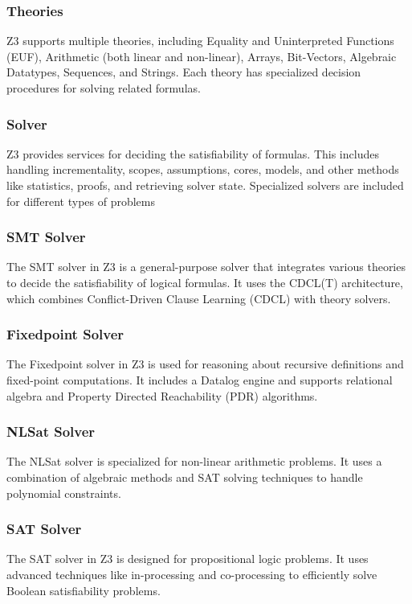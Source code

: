\documentclass[]{rptuseminar}
\begin{document}
\subsubsection{Theories}
Z3 supports multiple theories, including Equality and Uninterpreted Functions (EUF), Arithmetic (both linear and non-linear),
Arrays, Bit-Vectors, Algebraic Datatypes, Sequences, and Strings. Each theory has specialized decision procedures for solving
related formulas.

\subsubsection{Solver}
Z3 provides services for deciding the satisfiability of formulas. This includes handling incrementality, scopes, assumptions, 
cores, models, and other methods like statistics, proofs, and retrieving solver state. Specialized solvers are included for 
different types of problems

\subsubsection*{SMT Solver}
The SMT solver in Z3 is a general-purpose solver that integrates various theories to decide the satisfiability of logical formulas. 
It uses the CDCL(T) architecture, which combines Conflict-Driven Clause Learning (CDCL) with theory solvers.

\subsubsection*{Fixedpoint Solver}
The Fixedpoint solver in Z3 is used for reasoning about recursive definitions and fixed-point computations. 
It includes a Datalog engine and supports relational algebra and Property Directed Reachability (PDR) algorithms.

\subsubsection*{NLSat Solver}
The NLSat solver is specialized for non-linear arithmetic problems. 
It uses a combination of algebraic methods and SAT solving techniques to handle polynomial constraints.

\subsubsection*{SAT Solver}
The SAT solver in Z3 is designed for propositional logic problems. It uses advanced techniques like in-processing 
and co-processing to efficiently solve Boolean satisfiability problems.
\end{document}
